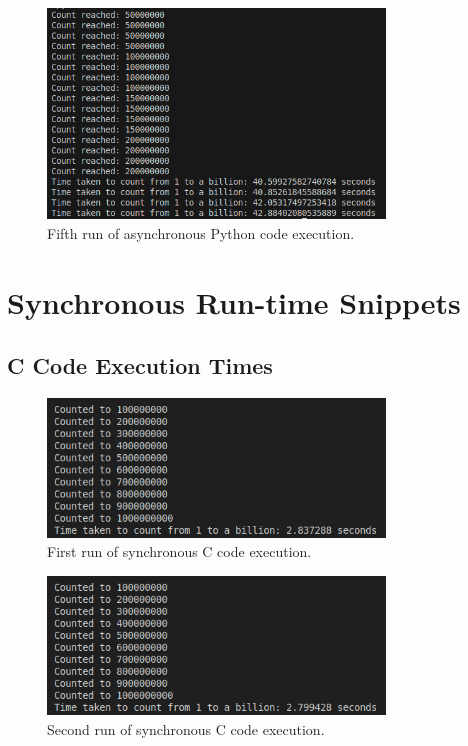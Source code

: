 \documentclass[12pt,a4paper]{article}
\begin{document}
\begin{figure}[htbp]
    \centering
    \includegraphics[width=0.8\textwidth]{../async_records/results_python/result_5.png}
    \caption{Fifth run of asynchronous Python code execution.}
    \label{fig:Python-async-runtime-5}
\end{figure}

\clearpage
\section{Synchronous Run-time Snippets}

\subsection{C Code Execution Times} 

\begin{figure}[htbp]
    \centering
    \includegraphics[width=0.8\textwidth]{../sync_records/results_c/result_1.png}
    \caption{First run of synchronous C code execution.}
    \label{fig:C-runtime-1}
\end{figure}

\begin{figure}[htbp]
    \centering
    \includegraphics[width=0.8\textwidth]{../sync_records/results_c/result_2.png}
    \caption{Second run of synchronous C code execution.}
    \label{fig:C-runtime-2}
\end{figure}
\end{document}
